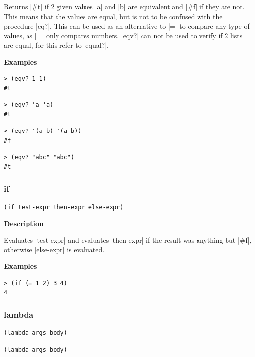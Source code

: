 \documentclass[a4paper]{article}
\begin{document}
Returns |#t| if 2 given values |a| and |b| are equivalent and |#f| if they are not. This means that the values are equal, but is not to be confused with the procedure |eq?|. This can be used as an alternative to |=| to compare any type of values, as |=| only compares numbers. |eqv?| can not be used to verify if 2 lists are equal, for this refer to |equal?|.

\textbf{Examples}

\begin{lstlisting}
> (eqv? 1 1)
#t
\end{lstlisting}

\begin{lstlisting}
> (eqv? 'a 'a)
#t
\end{lstlisting}

\begin{lstlisting}
> (eqv? '(a b) '(a b))
#f
\end{lstlisting}

\begin{lstlisting}
> (eqv? "abc" "abc")
#t
\end{lstlisting}

\subsubsection{if}

\begin{lstlisting}[frame=none]
(if test-expr then-expr else-expr)
\end{lstlisting}

\textbf{Description}

Evaluates |test-expr| and evaluates |then-expr| if the result was anything but |#f|, otherwise |else-expr| is evaluated.

\textbf{Examples}

\begin{lstlisting}
> (if (= 1 2) 3 4)
4
\end{lstlisting}

\subsubsection{lambda}

\begin{lstlisting}[frame=none,belowskip=0pt]
(lambda args body)
\end{lstlisting}
\begin{lstlisting}[frame=none,language=SchemeLambda,aboveskip=0pt]
(lambda args body)
\end{lstlisting}
\end{document}
